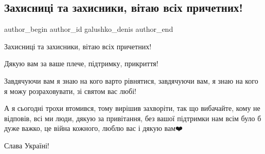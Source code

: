  
 
 
 
 

\subsection{Захисниці та захисники, вітаю всіх причетних!}
\label{sec:14_10_2022.fb.galushko_denis.1.zakhisnits__ta_zakhi}

\ifcmt
 author_begin
   author_id galushko_denis
 author_end
\fi

Захисниці та захисники, вітаю всіх причетних! 

Дякую вам за ваше плече, підтримку, прикриття!  

Завдячуючи вам я знаю на кого варто рівнятися, завдячуючи вам, я знаю на кого я
можу розраховувати, зі святом вас любі!

А я сьогодні трохи втомився, тому вирішив захворіти, так що вибачайте, кому
не відповів, всі ми люди, дякую за привітання, без вашої підтримки нам всім
було б дуже важко, це війна кожного, люблю вас і дякую вам❤️

Слава Україні!
